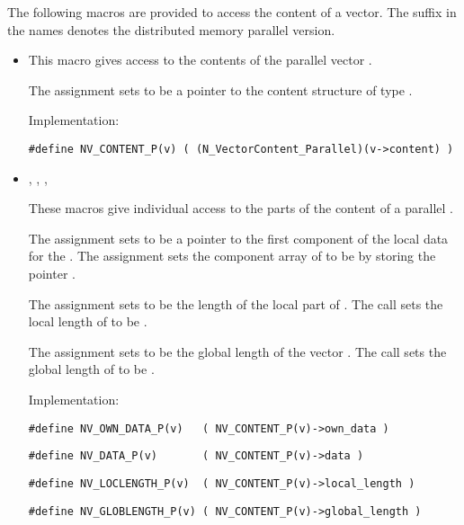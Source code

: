 The following macros are provided to access the content of a {\nvecp}
vector. The suffix  in the names denotes the distributed memory
parallel version.
\begin{itemize}

\item 

  This macro gives access to the contents of the parallel
  vector .
  
  The assignment  sets       
   to be a pointer to the  content    
  structure of type .
  
  Implementation:
  
  \verb|#define NV_CONTENT_P(v) ( (N_VectorContent_Parallel)(v->content) )|
  
\item 
  , , 
  , 
  
  These macros give individual access to the parts of    
  the content of a parallel .                        
  
  The assignment  sets  to be     
  a pointer to the first component of the local data for the  . 
  The assignment  sets the component array of 
   to be  by storing the pointer .                   
  
  The assignment  sets  to be     
  the length of the local part of . 
  The call  sets      
  the local length of  to be .
  
  The assignment  sets  to  
  be the global length of the vector .                    
  The call  sets the global       
  length of  to be .
  
  Implementation:
  
  \verb|#define NV_OWN_DATA_P(v)   ( NV_CONTENT_P(v)->own_data )|

  \verb|#define NV_DATA_P(v)       ( NV_CONTENT_P(v)->data )|

  \verb|#define NV_LOCLENGTH_P(v)  ( NV_CONTENT_P(v)->local_length )|

  \verb|#define NV_GLOBLENGTH_P(v) ( NV_CONTENT_P(v)->global_length )|
  

\end{itemize}

